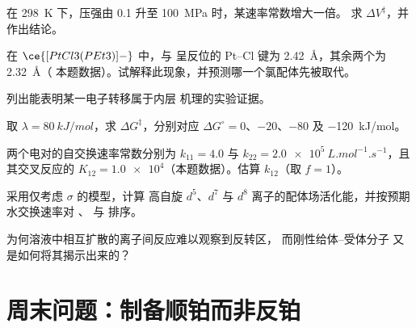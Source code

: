 \begin{exercise}[$\star\star$]\label{exo:b3:complex-mechanisms:6}
在 \qty{298}{K} 下，压强由 0.1 升至 \qty{100}{MPa} 时，某速率常数增大一倍。
求 $\Delta V^{\ddagger}$，并作出结论。
\end{exercise}

\begin{exercise}[$\star\star$]\label{exo:b3:complex-mechanisms:7}
在 $\ce{[PtCl3(PEt3)]-}$ 中，与  呈反位的 Pt--Cl 键为 \qty{2.42}{\angstrom}，其余两个为 \qty{2.32}{\angstrom}（
本题数据）。试解释此现象，并预测哪一个氯配体先被取代。
\end{exercise}

\begin{exercise}[$\star\star$]\label{exo:b3:complex-mechanisms:8}
列出能表明某一电子转移属于内层
机理的实验证据。
\end{exercise}

\begin{exercise}[$\star\star$]\label{exo:b3:complex-mechanisms:9}
取 $\lambda = \qty{80}{kJ/mol}$，求 $\Delta G^{\ddagger}$，分别对应 $\Delta G^\circ = 0$、$-20$、$-80$ 及 \qty{-120}{kJ/mol}。
\end{exercise}

\begin{exercise}[$\star\star\star$]\label{exo:b3:complex-mechanisms:10}
两个电对的自交换速率常数分别为 $k_{11} = 4.0$ 与 $k_{22} = \qty{2.0e5}{L.mol^{-1}.s^{-1}}$，且
其交叉反应的 $K_{12} = \num{1.0e4}$（本题数据）。估算 $k_{12}$（取 $f = 1$）。
\end{exercise}

\begin{exercise}[$\star\star\star$]\label{exo:b3:complex-mechanisms:11}
采用仅考虑 $\sigma$ 的模型，计算
高自旋 $d^5$、$d^7$ 与 $d^8$ 离子的配体场活化能，并按预期水交换速率对
、 与  排序。
\end{exercise}

\begin{exercise}[$\star\star\star$]\label{exo:b3:complex-mechanisms:12}
为何溶液中相互扩散的离子间反应难以观察到反转区，
而刚性给体–受体分子
又是如何将其揭示出来的？
\end{exercise}

\section{周末问题：制备顺铂而非反铂}

